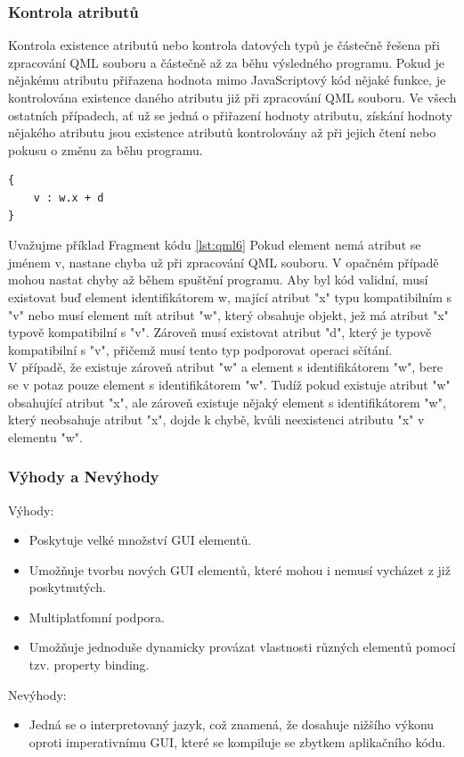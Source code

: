 \documentclass[report,11pt]{elsarticle}
\begin{document}
\subsubsection{Kontrola atributů}
Kontrola existence atributů nebo kontrola datových typů je částečně řešena při zpracování QML souboru a částečně až za běhu výsledného programu. Pokud je nějakému atributu přiřazena hodnota mimo JavaScriptový kód nějaké funkce, je kontrolována existence daného atributu již při zpracování QML souboru. Ve všech ostatních případech, ať už se jedná o přiřazení hodnoty atributu, získání hodnoty nějakého atributu jsou existence atributů kontrolovány až při jejich čtení nebo pokusu o změnu za běhu programu.
\begin{lstlisting}[frame=single,caption=Ukázka použití komponenty z jiného souboru.,label=lst:qml6]
{
	v : w.x + d
}
\end{lstlisting}
Uvažujme příklad Fragment kódu \ref{lst:qml6} Pokud element nemá atribut se jménem v, nastane chyba už při zpracování QML souboru. V opačném případě mohou nastat chyby až během spuštění programu. Aby byl kód validní, musí existovat buď element identifikátorem w, mající atribut "x" typu kompatibilním s "v" nebo musí element mít atribut "w", který obsahuje objekt, jež má atribut "x" typově kompatibilní s "v". Zároveň musí existovat atribut "d", který je typově kompatibilní s "v", přičemž musí tento typ podporovat operaci sčítání.\\
V případě, že existuje zároveň atribut "w" a element s identifikátorem "w", bere se v potaz pouze element s identifikátorem "w". Tudíž pokud existuje atribut "w" obsahující atribut "x", ale zároveň existuje nějaký element s identifikátorem "w", který neobsahuje atribut "x", dojde k chybě, kvůli neexistenci atributu "x" v elementu "w". 

\subsubsection{Výhody a Nevýhody}
Výhody:
\begin{itemize}
  \item Poskytuje velké množství GUI elementů.
  \item Umožňuje tvorbu nových GUI elementů, které mohou i nemusí vycházet z již poskytnutých.
  \item Multiplatfomní podpora.
  \item Umožňuje jednoduše dynamicky provázat vlastnosti různých elementů pomocí tzv. property binding.
\end{itemize}
Nevýhody:
\begin{itemize}
  \item Jedná se o interpretovaný jazyk, což znamená, že dosahuje nižšího výkonu oproti imperativnímu GUI, které se kompiluje se zbytkem aplikačního kódu.
\end{itemize}
\end{document}
